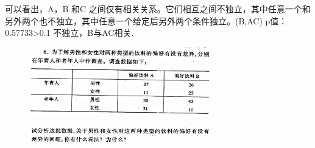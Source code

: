 \documentclass[11pt,a4paper]{ctexart}
\begin{document}
可以看出，A，B 和C 之间仅有相关关系。它们相互之间不独立，其中任意一个和另外两个也不独立，其中任意一个给定后另外两个条件独立。(B,AC)  p值： 0.57733>0.1  不独立，B与AC相关.

\begin{figure}[H]
	\centering
	\includegraphics[width=0.7\textwidth]{screenshot003}
	\label{fig:screenshot003}
\end{figure}
\begin{figure}[H]
	\centering
	\includegraphics[width=0.7\textwidth]{screenshot004}
	\label{fig:screenshot004}
\end{figure}
\end{document}
